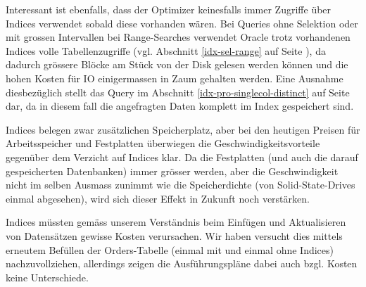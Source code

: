 \documentclass[11pt,a4paper,parskip=half]{scrartcl}
\begin{document}
Interessant ist ebenfalls, dass der Optimizer keinesfalls immer Zugriffe über Indices verwendet sobald diese vorhanden wären. Bei Queries ohne Selektion oder mit grossen Intervallen bei Range-Searches verwendet Oracle trotz vorhandenen Indices volle Tabellenzugriffe (vgl. Abschnitt \ref{idx-sel-range} auf Seite \pageref{idx-sel-range}), da dadurch grössere Blöcke am Stück von der Disk gelesen werden können und die hohen Kosten für IO einigermassen in Zaum gehalten werden. Eine Ausnahme diesbezüglich stellt das Query im Abschnitt \ref{idx-pro-singlecol-distinct} auf Seite \pageref{idx-pro-singlecol-distinct} dar, da in diesem fall die angefragten Daten komplett im Index gespeichert sind.

Indices belegen zwar zusätzlichen Speicherplatz, aber bei den heutigen Preisen für Arbeitsspeicher und Festplatten überwiegen die Geschwindigkeitsvorteile gegenüber dem Verzicht auf Indices klar. Da die Festplatten (und auch die darauf gespeicherten Datenbanken) immer grösser werden, aber die Geschwindigkeit nicht im selben Ausmass zunimmt wie die Speicherdichte (von Solid-State-Drives einmal abgesehen), wird sich dieser Effekt in Zukunft noch verstärken.

Indices müssten gemäss unserem Verständnis beim Einfügen und Aktualisieren von Datensätzen gewisse Kosten verursachen. Wir haben versucht dies mittels erneutem Befüllen der Orders-Tabelle (einmal mit und einmal ohne Indices) nachzuvollziehen, allerdings zeigen die Ausführungspläne dabei auch bzgl. Kosten keine Unterschiede.
\end{document}
